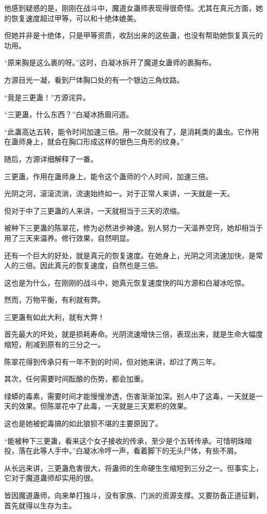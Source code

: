 \begin{this_body}
他感到疑惑的是，刚刚在战斗中，魔道女蛊师表现得很奇怪。尤其在真元方面，她的恢复速度超过甲等，可以和十绝体媲美。

但她并非是十绝体，只是甲等资质，收刮出来的这些蛊，也没有帮助她恢复真元的功用。

“原来胸是这么裹的呀。”这时，白凝冰拆开了魔道女蛊师的裹胸布。

方源目光一凝，看到尸体胸口处的有一个银边三角纹路。

“竟是三更蛊！”方源诧异。

“三更蛊，什么东西？”白凝冰扬眉问道。

“此蛊高达五转，能令时间加速三倍。用一次就没有了，是消耗类的蛊虫。它作用在蛊师身上，就会在胸口形成这样的银色三角形的纹身。”

随后，方源详细解释了一番。

三更蛊，作用在蛊师身上，能令这个蛊师的个人时间，加速三倍。

光阴之河，滚滚流淌，流速始终如一。对于正常人来讲，一天就是一天。

但对于中了三更蛊的人来讲，一天就相当于三天的浓缩。

被种下三更蛊的陈翠花，修为必然进步神速。别人努力一天温养空窍，她却相当于用了三天来温养。修行效果，自然明显。

还有一个巨大的好处，就是真元的恢复速度。在她身上，光阴之河流速加快，是常人的三倍。因此真元的恢复速度，自然也是三倍。

这也是为什么，在刚刚的战斗中，她真元恢复速度快的叫方源和白凝冰吃惊。

然而，万物平衡，有利就有弊。

三更蛊有如此大利，就有大弊！

首先最大的坏处，就是损耗寿命。光阴流速增快三倍，表现出来，就是生命大幅度缩短，削减到原有的三分之一。

陈翠花得到传承只有一年不到的时间，但对她来讲，却过了两三年。

其次，任何需要时间酝酿的伤势，都会加重。

绿蟒的毒素，需要时间才能慢慢渗透，伤害渐渐加深。别人中了这毒，一天就是一天的效果。但陈翠花中了此毒，一天就是三天累积的效果。

这也是她被蛇毒搞的如此狼狈不堪的主要原因了。

“能被种下三更蛊，看来这个女子接收的传承，至少是个五转传承。可惜明珠暗投，落在此等人手中。”白凝冰冷哼一声，看着脚下的无头尸体，有些不屑。

从长远来讲，三更蛊危害很大，将蛊师的生命硬生生缩短到三分之一。但事实上，它对于魔道蛊师却实用的很。

皆因魔道蛊师，向来单打独斗，没有家族、门派的资源支撑。又要防备正道征剿，首先就得以生存为主。


\end{this_body}
